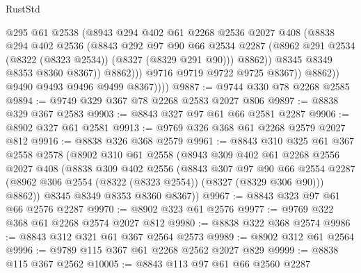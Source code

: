 \begin{lexlean}{RustStd}
\begin{coremodule}
{\begin{coremodule}
{{{{{{{{{{{{{{{{{{{{{{{{{{{{{{{{{{{{{{{{{{{{{{{{{{{{{{                            @295
                            @61
                            @2538
                            (@8943
                              @294
                              @402
                              @61
                              @2268
                              @2536
                              @2027
                              @408
                              (@8838
                                @294
                                @402
                                @2536
                                (@8843
                                  @292
                                  @97
                                  @90
                                  @66
                                  @2534
                                  @2287
                                  (@8962 @291 @2534 (@8322 (@8323 @2534)) (@8327 (@8329 @291 @90)))
                                  @8862))
                              @8345
                              @8349
                              @8353
                              @8360
                              @8367))
                          @8862)))
                    @9716
                    @9719
                    @9722
                    @9725
                    @8367))
                @8862))
            @9490
            @9493
            @9496
            @9499
            @8367))))
@9887 := @9744 @330 @78 @2268 @2585
@9894 := @9749 @329 @367 @78 @2268 @2583 @2027 @806
@9897 := @8838 @329 @367 @2583
@9903 := @8843 @327 @97 @61 @66 @2581 @2287
@9906 := @8902 @327 @61 @2581
@9913 := @9769 @326 @368 @61 @2268 @2579 @2027 @812
@9916 := @8838 @326 @368 @2579
@9961 := @8843
    @310
    @325
    @61
    @367
    @2558
    @2578
    (@8902
      @310
      @61
      @2558
      (@8943
        @309
        @402
        @61
        @2268
        @2556
        @2027
        @408
        (@8838
          @309
          @402
          @2556
          (@8843
            @307
            @97
            @90
            @66
            @2554
            @2287
            (@8962 @306 @2554 (@8322 (@8323 @2554)) (@8327 (@8329 @306 @90)))
            @8862))
        @8345
        @8349
        @8353
        @8360
        @8367))
@9967 := @8843 @323 @97 @61 @66 @2576 @2287
@9970 := @8902 @323 @61 @2576
@9977 := @9769 @322 @368 @61 @2268 @2574 @2027 @812
@9980 := @8838 @322 @368 @2574
@9986 := @8843 @312 @321 @61 @367 @2564 @2573
@9989 := @8902 @312 @61 @2564
@9996 := @9789 @115 @367 @61 @2268 @2562 @2027 @829
@9999 := @8838 @115 @367 @2562
@10005 := @8843 @113 @97 @61 @66 @2560 @2287
}}}}}}}}}}}}}}}}}}}}}}}}}}}}}}}}}}}}}}}}}}}}}}}}}}}}}}
\end{coremodule}}
\end{coremodule}
\end{lexlean}
